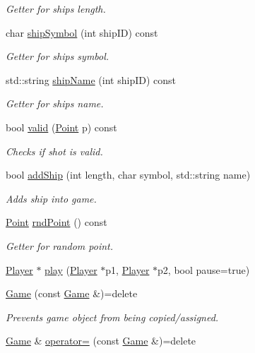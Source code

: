 \begin{DoxyCompactItemize}
\begin{DoxyCompactList}\small\item\em Getter for ship\textquotesingle{}s length. \end{DoxyCompactList}\item 
char \mbox{\hyperlink{class_game_a4d7e709c85b6abd5defa24f5f78cd1d1}{ship\+Symbol}} (int ship\+ID) const
\begin{DoxyCompactList}\small\item\em Getter for ship\textquotesingle{}s symbol. \end{DoxyCompactList}\item 
std\+::string \mbox{\hyperlink{class_game_aa652b00557acd25657c4aeface33d29a}{ship\+Name}} (int ship\+ID) const
\begin{DoxyCompactList}\small\item\em Getter for ship\textquotesingle{}s name. \end{DoxyCompactList}\item 
bool \mbox{\hyperlink{class_game_a3ec9ae2ce5d1ac1cbf4ed18aa7141744}{valid}} (\mbox{\hyperlink{class_point}{Point}} p) const
\begin{DoxyCompactList}\small\item\em Checks if shot is valid. \end{DoxyCompactList}\item 
bool \mbox{\hyperlink{class_game_a3ac4fd5a820cafec68f05cc81c26492a}{add\+Ship}} (int length, char symbol, std\+::string name)
\begin{DoxyCompactList}\small\item\em Adds ship into game. \end{DoxyCompactList}\item 
\mbox{\hyperlink{class_point}{Point}} \mbox{\hyperlink{class_game_acd99c992d69fe990abfb16ab1bde177c}{rnd\+Point}} () const
\begin{DoxyCompactList}\small\item\em Getter for random point. \end{DoxyCompactList}\item 
\mbox{\hyperlink{class_player}{Player}} $\ast$ \mbox{\hyperlink{class_game_a9102360e66754f58044c93d80260f6d0}{play}} (\mbox{\hyperlink{class_player}{Player}} $\ast$p1, \mbox{\hyperlink{class_player}{Player}} $\ast$p2, bool pause=true)
\item 
\mbox{\hyperlink{class_game_abb28875d74d25fa9e0dcdbe37c6ad89c}{Game}} (const \mbox{\hyperlink{class_game}{Game}} \&)=delete
\begin{DoxyCompactList}\small\item\em Prevents game object from being copied/assigned. \end{DoxyCompactList}\item 
\mbox{\hyperlink{class_game}{Game}} \& \mbox{\hyperlink{class_game_a4d0c0503733cc50b0b5cb8d7ef1237ec}{operator=}} (const \mbox{\hyperlink{class_game}{Game}} \&)=delete
\end{DoxyCompactItemize}



